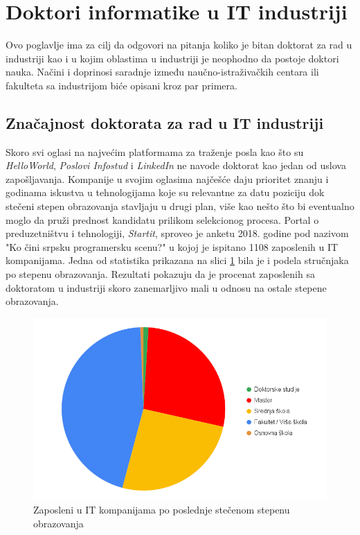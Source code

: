 \documentclass[a4paper]{article}
\begin{document}
\section{Doktori informatike u IT industriji}
\label{sec:industrija}

Ovo poglavlje ima za cilj da odgovori na pitanja koliko je bitan doktorat za rad u industriji kao i u kojim oblastima u industriji je neophodno da postoje doktori nauka. Načini i doprinosi saradnje između naučno-istraživačkih centara ili fakulteta sa industrijom biće opisani kroz par primera.

\subsection{Značajnost doktorata za rad u IT industriji}

Skoro svi oglasi na najvećim platformama za traženje posla kao što su \textit{HelloWorld}, \textit{Poslovi Infostud} i \textit{LinkedIn} ne navode doktorat kao jedan od uslova zapošljavanja. Kompanije u svojim oglasima najčešće daju prioritet znanju i godinama iskustva u tehnologijama koje su relevantne za datu poziciju dok stečeni stepen obrazovanja stavljaju u drugi plan, više kao nešto što bi eventualno moglo da pruži prednost kandidatu prilikom selekcionog procesa. Portal o preduzetništvu i tehnologiji, \textit{Startit}, sproveo je anketu 2018. godine pod nazivom "Ko čini srpsku programersku scenu?" u kojoj je ispitano 1108 zaposlenih u IT kompanijama.\cite{startit} Jedna od statistika prikazana na slici \ref{fig:job-pie} bila je i podela stručnjaka po stepenu obrazovanja. Rezultati pokazuju da je procenat zaposlenih sa doktoratom u industriji skoro zanemarljivo mali u odnosu na ostale stepene obrazovanja.

\begin{figure}[h!]
\begin{center}
\includegraphics[scale=0.4]{PieChart.png}
\end{center}
\caption{Zaposleni u IT kompanijama po poslednje stečenom stepenu obrazovanja}
\label{fig:job-pie}
\end{figure}
\end{document}
